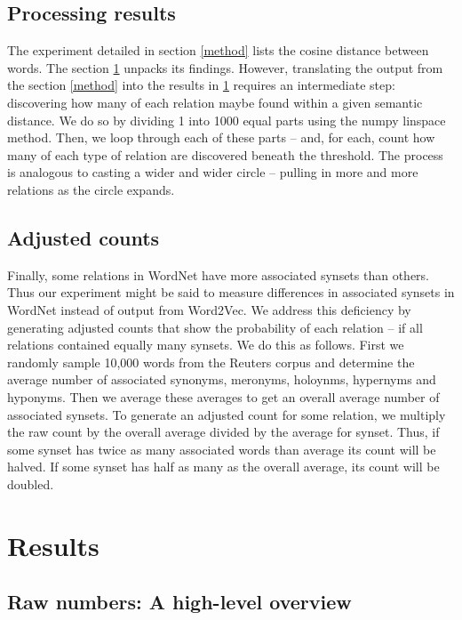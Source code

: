 \documentclass[titlepage]{article}
\begin{document}
\subsection{Processing results}

The experiment detailed in section \ref{method} lists the cosine distance between words. The section \ref{results} unpacks its findings. However, translating the output from the section \ref{method} into the results in \ref{results} requires an intermediate step: discovering how many of each relation maybe found within a given semantic distance. We do so by dividing 1 into 1000 equal parts using the numpy linspace method. Then, we loop through each of these parts -- and, for each, count how many of each type of relation are discovered beneath the threshold. The process is analogous to casting a wider and wider circle -- pulling in more and more relations as the circle expands.

\subsection{Adjusted counts}

Finally, some relations in WordNet have more associated synsets than others. Thus our experiment might be said to measure differences in associated synsets in WordNet instead of output from Word2Vec. We address this deficiency by generating adjusted counts that show the probability of each relation -- if all relations contained equally many synsets. We do this as follows. First we randomly sample 10,000 words from the Reuters corpus and determine the average number of associated synonyms, meronyms, holoynms, hypernyms and hyponyms. Then we average these averages to get an overall average number of associated synsets. To generate an adjusted count for some relation, we multiply the raw count by the overall average divided by the average for synset. Thus, if some synset has twice as many associated words than average its count will be halved. If some synset has half as many as the overall average, its count will be doubled.

\section{Results} \label{results}

\subsection{Raw numbers: A high-level overview} \label{raw}
\end{document}
